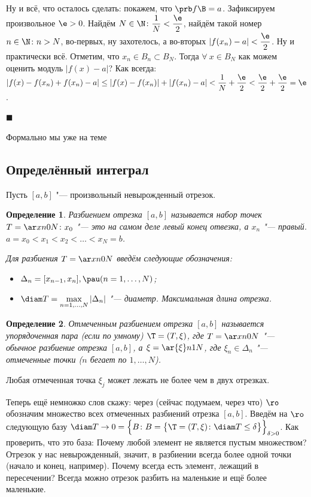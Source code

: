 \documentclass[a4paper,10pt,twoside]{article}
\newtheorem{Def}{Определение}[section]
\newenvironment{Proof}
       {\par\noindent{\textbf{Доказательство.}}}
       {\hfill$\scriptstyle\blacksquare$}
\begin{document}
\begin{Proof}
\begin{itemize}
 	  Ну и всё, что осталось сделать: покажем, что $\prb f\B=a$. Зафиксируем произвольное $\e>0$. Найдём $N\in\N\colon\dfrac1N<\dfrac{\e}2$, найдём
 	  такой номер $n\in\N\colon n>N$, во-первых, ну захотелось, а во-вторых $|f(x_n)-a|<\dfrac{\e}2$. Ну и практически всё.
 	  Отметим, что $x_n\in B_n\subset B_N$. Тогда $\forall\  x\in B_N$ как можем оценить модуль $|f(x)-a|$? Как всегда: 
 	  $|f(x)-f(x_n)+f(x_n)-a|\leq|f(x)-f(x_n)|+|f(x_n)-a|<\dfrac1N+\dfrac{\e}2<\dfrac{\e}2+\dfrac{\e}2=\e$. 
 	\end{itemize}
 \end{Proof}
 
 Формально мы уже на теме
 
 \subsection{Определённый интеграл}
 Пусть $[a,b]$ "--- произвольный невырожденный отрезок.
 
 \begin{Def}
 	Разбиением отрезка $[a,b]$ называется набор точек $T=\ar xn0N\colon x_0$ "---
 	это на самом деле левый конец отвезка, а $x_n$ "--- правый. $a=x_0<x_1<x_2<\ldots<x_N=b$.
 	
 	Для разбиения $T=\ar xn0N$ введём следующие обозначения:
 	\begin{itemize}
 	  \item $\Delta_n=[x_{n-1},x_n],\pau (n=1,\ldots,N)$;
 	  \item $\diam T=\max\limits_{n=1,\ldots,N}|\Delta_n|$ "--- диаметр. Максимальная длина отрезка.
 	\end{itemize}
 \end{Def}
 
 \begin{Def}
 	Отмеченным разбиением отрезка $[a,b]$ называется упорядоченная пара (если по умному) $\T=(T,\xi)$, где
 	$T=\ar xn0N$ "--- обычное разбиение отрезка $[a,b]$, а 
 	$\xi=\ar{\xi}n1N$, где $\xi_n\in\Delta_n$ "--- отмеченные точки ($n$ бегает по $1,\ldots,N$).
 \end{Def}
 
 Любая отмеченная точка $\xi_j$ может лежать не более чем в двух отрезках.
 
 Теперь ещё немножко слов скажу: через (сейчас подумаем, через что) $\ro$ обозначим множество всех отмеченных разбиений отрезка
 $[a,b]$. Введём на $\ro$ следующую базу $\diam T\to0=\Big\{B\colon B=\big\{\T=(T,\xi)\colon \diam T\leq \delta\big\}\Big\}_{\delta>0}$. Как проверить, что это база:
 Почему любой элемент не является пустым множеством? Отрезок у нас невырожденный, значит, в разбиении всегда более одной точки (начало и конец, например).
 Почему всегда есть элемент, лежащий в пересечении? Всегда можно отрезок разбить на маленькие и ещё более маленькие.
 
\end{document}
